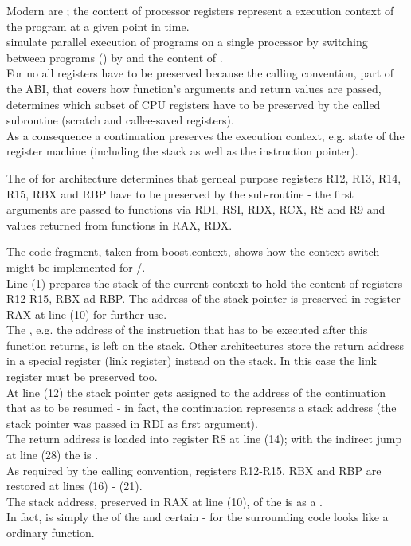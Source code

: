 \label{mechanism}

Modern  are ; the content of
processor registers represent a execution context of the program at a given
point in time.\\
 simulate parallel execution of programs on a single
processor by switching between programs () by
 and  the content of .\\

For \cc no all registers have to be preserved because the calling convention,
part of the ABI, that covers how function's arguments and return values are
passed, determines which subset of CPU registers have to be preserved by the
called subroutine (scratch and callee-saved registers).\\

As a consequence a continuation preserves the execution context, e.g. state of
the register machine (including the stack as well as the instruction pointer).

The \cite{SYSVABI} of  for 
architecture determines that gerneal purpose registers R12, R13, R14, R15, RBX
and RBP have to be preserved by the sub-routine - the first arguments are passed
to functions via RDI, RSI, RDX, RCX, R8 and R9 and values returned from
functions in RAX, RDX.\\


The code fragment, taken from boost.context\cite{bcontext}, shows how the
context switch might be implemented for /.\\
Line (1) prepares the stack of the current context to hold the content of
registers R12-R15, RBX ad RBP. The address of the stack pointer is preserved in
register RAX at line (10) for further use.\\
The , e.g. the address of the instruction that has to be
executed after this function returns, is left on the stack. Other architectures
store the return address in a special register (link register) instead on the
stack. In this case the link register must be preserved too.\\
At line (12) the stack pointer gets assigned to the address of the
continuation that as to be resumed - in fact, the continuation represents a
stack address (the stack pointer was passed in RDI as first argument).\\
The return address is loaded into register R8 at line (14); with the indirect
jump at line (28) the  is .\\
As required by the calling convention, registers R12-R15, RBX and RBP are
restored at lines (16) - (21).\\
The stack address, preserved in RAX at line (10), of the
 is  as a .\\

In fact, \cc is simply the  of the  and certain
 - for the surrounding code \cc looks like a
ordinary function.
